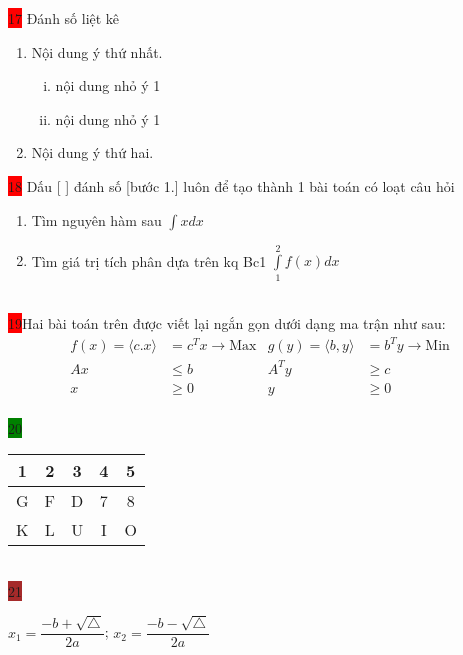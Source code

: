 \documentclass{article}
\begin{document}
\colorbox{red}{17} Đánh số liệt kê
 \begin{enumerate}
 \item Nội dung ý thứ nhất.
 \begin{enumerate}[i.]
 \item nội dung nhỏ ý 1
 \item nội dung nhỏ ý 1
 \end{enumerate}
 \item Nội dung ý thứ hai.
 \end{enumerate}

\colorbox{red}{18}  Dấu [ ] đánh số [bước 1.] luôn để tạo thành 1 bài toán có loạt câu hỏi
\begin{enumerate}[Bước 1.]
\item Tìm nguyên hàm sau $\displaystyle\int xdx $
\item Tìm giá trị tích phân dựa trên kq Bc1 $\displaystyle\int\limits_1^2f(x)dx$
\end{enumerate}\\

\colorbox{red}{19}\quad Hai bài toán trên được viết lại ngắn gọn dưới dạng ma trận như sau:
\begin{align*}
       f(x) =\langle c.x \rangle&= c^Tx \longrightarrow \text{Max}   & g(y) =\langle b,y \rangle&= b^Ty \longrightarrow \text{Min}\\
      Ax &\leq b & A^Ty &\geq c \\
     x &\geq 0 &  y &\geq 0
\end{align*}\\

\colorbox{green}{20}\\

             \begin{tabular}{|c|c|c|c|c|}
                \hline %
                \rowcolor{pink} 1 & 2 & 3 & 4 & 5 \\ %
                \hline %
                \cellcolor{yellow} G & F & D & 7 & 8 \\ %
                \hline
                K & L & \cellcolor{red} U & I & O \\ %


             \end{tabular}\\




\colorbox{brown}{21} \\
\begin{center}
\color{red} $ x_1= \dfrac{-b+  \sqrt\triangle}{2a}$;\quad
\color{red} $x_2 = \dfrac{-b-\sqrt\triangle}{2a}$
\end{center}\\
\end{document}

